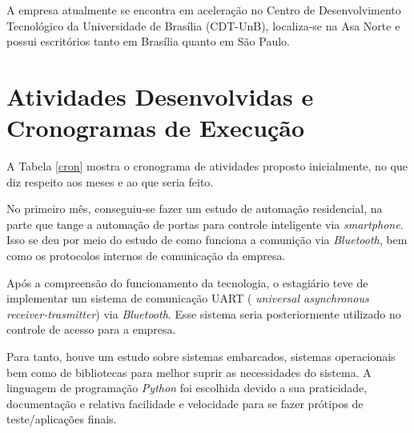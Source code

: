 \documentclass[12pt,fleqn]{article}
\begin{document}
A empresa atualmente se encontra em aceleração no Centro de Desenvolvimento Tecnológico da Universidade de Brasília (CDT-UnB),
localiza-se na Asa Norte e possui escritórios tanto em Brasília quanto em São Paulo.

\section{Atividades Desenvolvidas e Cronogramas de Execução}

\hspace*{1.25cm} A Tabela \ref{cron} mostra o cronograma de atividades proposto inicialmente, no que diz respeito aos meses e 
ao que seria feito.


\begin{table}[h!]
\centering
\caption {Cronograma de atividades proposto.}

\label{cron}
\end{table}

No primeiro mês, conseguiu-se fazer um estudo de automação residencial, na parte que tange a automação de portas para
controle inteligente via \textit{smartphone}. Isso se deu por meio do estudo de como funciona a comunição via 
\textit{Bluetooth}, bem como os protocolos internos de comunicação da empresa.

Após a compreensão do funcionamento da tecnologia, o estagiário teve de implementar um sistema de comunicação UART
( \textit{universal asynchronous receiver-trasmitter}) via \textit{Bluetooth}. Esse sistema seria posteriormente utilizado
no controle de acesso para a empresa. 

Para tanto, houve um estudo sobre sistemas embarcados,  sistemas operacionais bem como
de bibliotecas para melhor suprir as necessidades do sistema. A linguagem de programação \textit{Python} foi escolhida
devido a sua praticidade, documentação e relativa facilidade  e velocidade
para se fazer prótipos de teste/aplicações finais.
\end{document}
